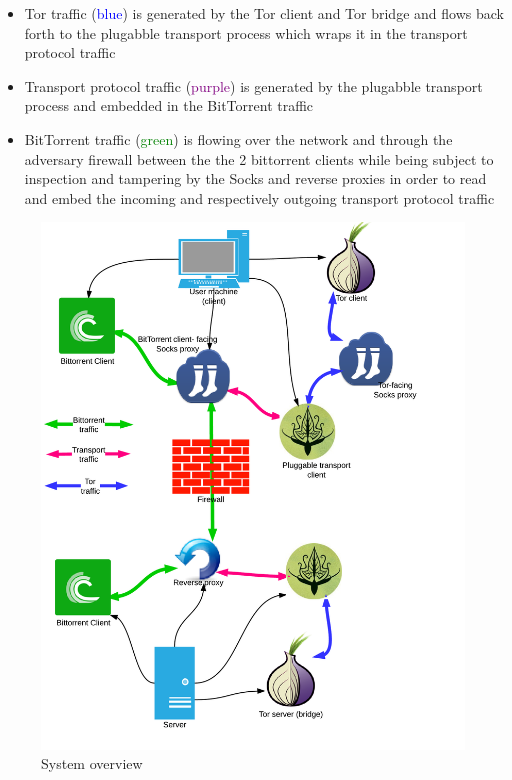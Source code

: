 \documentclass[11pt]{article} %
\begin{document}
\begin{itemize}
\item Tor traffic (\textcolor{blue}{blue}) is generated by the Tor client and Tor bridge and flows back forth to the plugabble transport process which wraps it in the transport protocol traffic 
\item Transport protocol traffic (\textcolor{purple}{purple}) is generated by the plugabble transport process and embedded in the BitTorrent traffic
\item  BitTorrent traffic (\textcolor{green}{green}) is flowing over the network and through the adversary firewall between the the 2 bittorrent clients while being subject to inspection and tampering by the Socks and reverse proxies in order to read and embed the incoming and respectively outgoing transport protocol traffic 
\end{itemize}

\begin{figure}[h!]
\begin{center}
\includegraphics[scale=0.23]{FuinSystemArchitecture}
\end{center}
 \caption{System overview}
 \label{fig:system_architecture}
 \end{figure}
\end{document}
